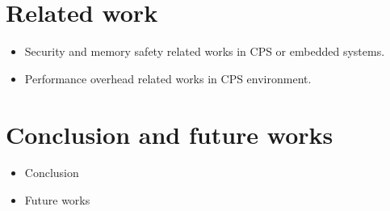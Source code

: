 \documentclass{acm_proc_article-sp}
\begin{document}
\section{Related work}
\begin{itemize}
\item Security and memory safety related works in CPS or embedded systems. 
\item Performance overhead related works in CPS environment. 
\end{itemize}
\section{Conclusion and future works}
\begin{itemize}
\item Conclusion
\item Future works
\end{itemize}



\nocite{*}
\end{document}
